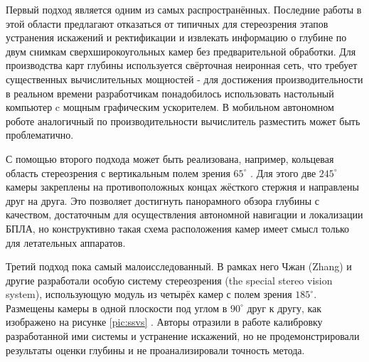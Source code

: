 Первый подход является одним из самых распространённых. Последние работы в этой области предлагают \cite{direct_neuro_stereo} отказаться от типичных 
для стереозрения этапов устранения искажений и ректификации и извлекать информацию о глубине по двум снимкам сверхширокоугольных камер без 
предварительной обработки. Для производства карт глубины используется свёрточная неиронная сеть, что требует существенных вычислительных 
мощностей - для достижения производительности в реальном времени разработчикам понадобилось использовать настольный компьютер c мощным графическим ускорителем. 
В мобильном автономном роботе аналогичный по производительности вычислитель разместить может быть проблематично. 

С помощью второго подхода может быть реализована, например, кольцевая область стереозрения с вертикальным  %
полем зрения $65^\circ$ \cite{omni_stereo}. Для этого две $245^\circ$ камеры закреплены на противоположных концах жёсткого стержня 
и направлены друг на друга. Это позволяет достигнуть панорамного обзора глубины с качеством, достаточным для осуществления автономной навигации и
локализации БПЛА\cite{omni_copter}, но конструктивно такая схема расположения камер имеет смысл только для летательных аппаратов.  

Третий подход пока самый малоисследованный. В рамках него Чжан (Zhang) и другие разработали особую систему стереозрения (the special stereo vision 
system), использующую модуль из четырёх камер с полем зрения $185^\circ$. Размещены камеры в одной плоскости под углом в $90^\circ$ друг к другу, 
как изображено на рисунке \ref{pic:ssvs} \cite{zhang_system}. Авторы отразили в работе калибровку разработанной ими системы и устранение искажений, 
но не  продемонстрировали результаты оценки глубины и не проанализировали точность метода. 

